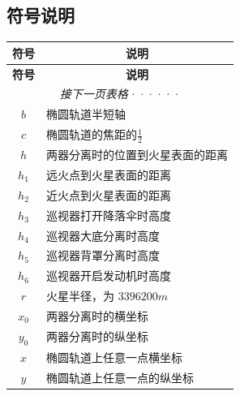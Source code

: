 \documentclass[hyperref,a4paper,UTF8]{ctexart}
\begin{document}
\subsection{符号说明}
\begin{longtable}[h]{|c|p{10cm}|}
    \hline
    \bfseries 符号     & \multicolumn{1}{c|}{\bfseries 说明}                    \\
    \endhead
    \hline
    \bfseries 符号     & \multicolumn{1}{c|}{\bfseries 说明}                    \\
    \endfirsthead
    \multicolumn{2}{c}{\itshape 接下一页表格······}
    \endfoot
    \endlastfoot
    \hline
    $a$                & 椭圆轨道半长轴                                         \\
    \hline
    $b$                & 椭圆轨道半短轴                                         \\
    \hline
    $c$                & 椭圆轨道的焦距的{}$\frac{1}{2}$                        \\
    \hline
    $h$                & 两器分离时的位置到火星表面的距离                       \\
    \hline
    $h_1$              & 远火点到火星表面的距离                                 \\
    \hline
    $h_2$              & 近火点到火星表面的距离                                 \\
    \hline
    $h_3$              & 巡视器打开降落伞时高度                                 \\
    \hline
    $h_4$              & 巡视器大底分离时高度                                   \\
    \hline
    $h_5$              & 巡视器背罩分离时高度                                   \\
    \hline
    $h_6$              & 巡视器开启发动机时高度                                 \\
    \hline
    $r$                & 火星半径，为 $3396200m$                                \\
    \hline
    $x_0$              & 两器分离时的横坐标                                     \\
    \hline
    $y_0$              & 两器分离时的纵坐标                                     \\
    \hline
    $x$                & 椭圆轨道上任意一点横坐标                               \\
    \hline
    $y$                & 椭圆轨道上任意一点的纵坐标                             \\

\end{longtable}
\end{document}
